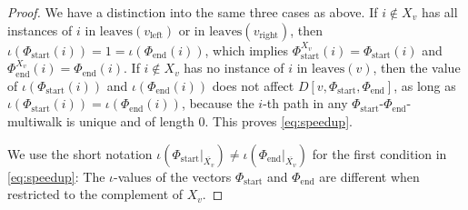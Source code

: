 \begin{proof}
We have a distinction into the same three cases as above.
If $i \notin X_v$ has all instances of $i$ in $\text{leaves}(v_\text{left})$ or in $\text{leaves}(v_\text{right})$, then
$\iota(\Phi_\text{start}(i))=1=\iota(\Phi_\text{end}(i))$, which implies
$\Phi_\text{start}^{X_v}(i)=\Phi_\text{start}(i)$ and $\Phi_\text{end}^{X_v}(i)=\Phi_\text{end}(i)$.
If $i \notin X_v$ has no instance of $i$ in $\text{leaves}(v)$, then the value of $\iota(\Phi_\text{start}(i))$ and $\iota(\Phi_\text{end}(i))$ does not affect $D[v,\Phi_\text{start},\Phi_\text{end}]$, as long as $\iota(\Phi_\text{start}(i))=\iota(\Phi_\text{end}(i))$, because the $i$-th path in any $\Phi_\text{start}$-$\Phi_\text{end}$-multiwalk is unique and of length 0.
This proves \eqref{eq:speedup}.

We use the short notation $\iota(\Phi_\text{start}|_{\overline{X_v}})\neq\iota(\Phi_\text{end}|_{\overline{X_v}})$ for the first condition in \eqref{eq:speedup}: The $\iota$-values of the vectors $\Phi_\text{start}$ and $\Phi_\text{end}$ are different when restricted to the complement of $X_v$.


\end{proof}
